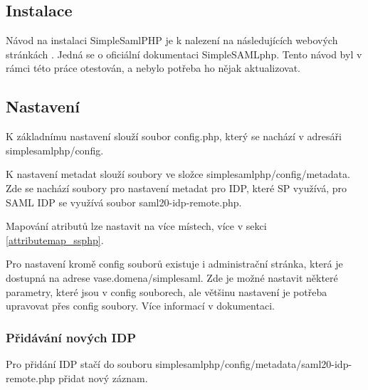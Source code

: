 \subsection{Instalace}
Návod na instalaci SimpleSamlPHP je k nalezení na následujících webových stránkách \cite{SimpleSAMLphp-instalation-and-configurationduid}. Jedná se o oficiální dokumentaci SimpleSAMLphp. Tento návod byl v rámci této práce otestován, a nebylo potřeba ho nějak aktualizovat.

\subsection{Nastavení} %
K základnímu nastavení slouží soubor config.php, který se nachází v adresáři simplesamlphp/config.

K nastavení metadat slouží soubory ve složce simplesamlphp/config/metadata. Zde se nachází soubory pro nastavení metadat pro IDP, které SP využívá, pro SAML IDP se využívá soubor saml20-idp-remote.php.

Mapování atributů lze nastavit na více místech, více v sekci \ref{attributemap_ssphp}.

Pro nastavení kromě config souborů existuje i administrační stránka, která je dostupná na adrese vase.domena/simplesaml. Zde je možné nastavit některé parametry, které jsou v config souborech, ale většinu nastavení je potřeba upravovat přes config soubory.
Více informací v dokumentaci. \cite{simplesamlphpdoc}

\subsubsection{Přidávání nových IDP} %

Pro přidání IDP stačí do souboru simplesamlphp/config/metadata/saml20-idp-remote.php přidat nový záznam.


